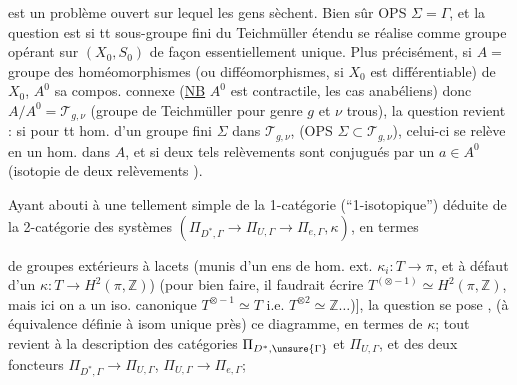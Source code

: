 est un problème ouvert sur lequel les
gens sèchent. Bien sûr OPS \(\Sigma=\Gamma\),
et la question est si tt sous-groupe
fini du Teichmüller étendu se
réalise comme groupe opérant sur \((X_0,S_0)\) 
de façon essentiellement unique. Plus
précisément, si  \(A=\) groupe des homéomorphismes
(ou difféomorphismes, si \(X_0\) est
différentiable) de \(X_0\), \(A^0\) sa compos. 
connexe (\uline{NB} \(A^0\) est contractile, \deleted{\unsure{)}}
les cas anabéliens) donc \(A/A^0=\mathcal T_{g,\nu}\)
(groupe de Teichmüller pour genre \(g\) et \(\nu\)
trous), la question revient :  si pour tt
hom. d'un groupe fini \(\Sigma\) dans  \(\mathcal T_{g,\nu}\),
(OPS \(\Sigma\subset\mathcal T_{g,\nu}\)), celui-ci se relève
en un hom. dans \(A\), et si deux tels
relèvements sont conjugués par un \(a\in A^0\)
(isotopie  de deux relèvements \unsure{\(\sim\)}).

Ayant abouti à une  tellement
simple de la 1-catégorie (``1-isotopique'') déduite
de la 2-catégorie des systèmes
\((\Pi_{D^*,\Gamma}\longrightarrow\Pi_{U,\Gamma}\longrightarrow\Pi_{e,\Gamma},\kappa)\), en termes

de groupes extérieurs à lacets (\inserted{\(\pi\)}munis
d'un ens de hom. ext. \(\kappa_i:T\longrightarrow\pi\), et
à défaut d'un \(\kappa:T\longrightarrow H^2(\pi,\mathbb Z)\))
(pour bien faire, il faudrait écrire
\(T^{(\otimes-1)}\simeq H^2(\pi,\mathbb Z)\), mais ici on a un iso.
canonique \(T^{\otimes-1}\simeq T\) i.e. \(T^{\otimes 2}\simeq\mathbb Z\ldots\))],
la question se pose ,
(à équivalence définie à isom unique près)
ce diagramme, en termes de \(\kappa\); tout
revient à la  description des
catégories \(\Pi_{D^*,\unsure{\Gamma}}\) et \(\Pi_{U,\Gamma}\), et des deux
foncteurs \(\Pi_{D^*,\Gamma}\longrightarrow\Pi_{U,\Gamma}\), \(\Pi_{U,\Gamma}\longrightarrow\Pi_{e,\Gamma}\);

